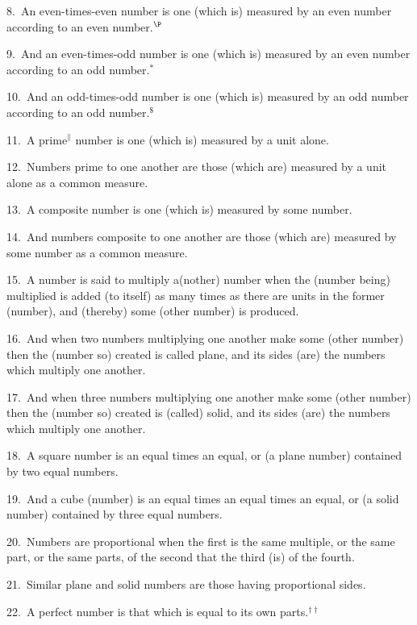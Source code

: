 \begin{Parallel}{}{}
{8.~An even-times-even number is one (which is) measured by an
even number according to an even number.$^\P$

9.~And an even-times-odd number is one (which is) measured by an
even number according to an odd number.$^\ast$

10.~And an odd-times-odd number is one (which is) measured by an
odd number according to an odd number.$^\$$

11.~A prime$^\|$  number is one (which is) measured by a unit alone.

12.~Numbers prime to one another are those (which are) measured by a unit
alone as a common measure.

13.~A composite number is one (which is) measured by some number.

14.~And numbers composite to one another are those (which are) measured
by some number as a common measure.

15.~A number is said to multiply a(nother) number when the (number being) multiplied is added (to itself) as many times as there are units
 in the former (number), and (thereby) some (other number) is produced.
 
16.~And when two numbers multiplying one another make some
(other number) then the (number so) created  is called plane, and its sides (are) the numbers
which multiply one another.

17.~And when three numbers multiplying one another make some (other number)
then the (number so) created is (called) solid, and its sides (are) the numbers which multiply
one another.

18.~A square number is an equal times an equal, or (a plane number)
contained by two equal numbers.

19.~And a cube (number) is an equal times an equal times an equal,
or (a solid number) contained by three equal numbers.

20.~Numbers are proportional when the first is the same multiple, or
the same part, or the same parts,
of the second that the third (is) of the fourth.

21.~Similar plane and solid numbers are those having proportional
sides.

22.~A perfect number is that which is equal to its own parts.$^{\dag\dag}$}
\end{Parallel}



